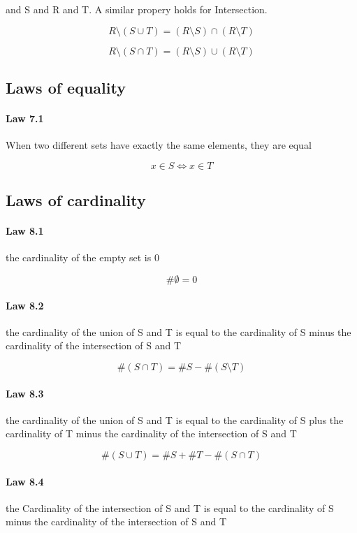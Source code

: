 \documentclass[twocolumn]{article}
\begin{document}
and S and R and T. A similar propery holds for Intersection.

$$ R \setminus (S  \cup  T) = (R \setminus S)  \cap  (R \setminus T) $$

$$ R \setminus (S  \cap  T) = (R \setminus S)  \cup  (R \setminus T) $$

\subsection{Laws of equality}

\paragraph{Law 7.1} When two different sets have exactly the same elements, they are equal

$$ x \in S\iff x \in T $$

\subsection{Laws of cardinality}

\paragraph{Law 8.1} the cardinality of the empty set is 0

$$ \# \emptyset = 0 $$

\paragraph{Law 8.2} the cardinality of the union of S and T is equal to the cardinality of S minus the cardinality of the intersection of S and T

$$ \#(S  \cap  T) = \#S - \#(S\setminus T) $$

\paragraph{Law 8.3} the cardinality of the union of S and T is equal to the cardinality of S plus the cardinality of T minus the cardinality of the intersection of S and T

$$ \#(S  \cup  T) = \#S + \#T - \#(S  \cap  T) $$

\paragraph{Law 8.4} the Cardinality of the intersection of S and T is equal to the cardinality of S minus the cardinality of the intersection of S and T
\end{document}
